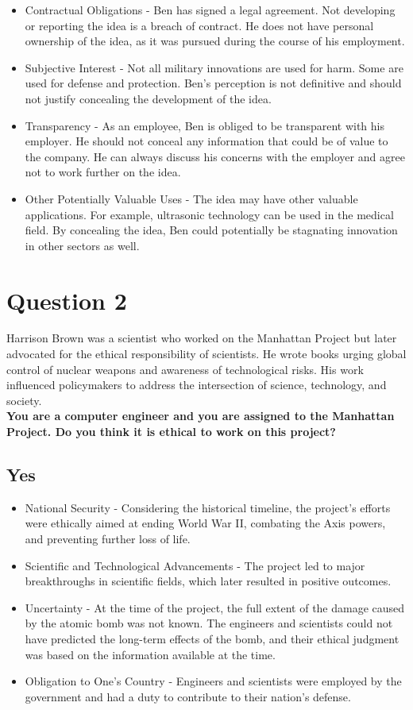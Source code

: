 \documentclass{article}
\begin{document}
\begin{itemize}
    \item Contractual Obligations - Ben has signed a legal agreement. Not developing or reporting the idea is a breach of contract. He does not have personal ownership of the idea, as it was pursued during the course of his employment.
    \item Subjective Interest - Not all military innovations are used for harm. Some are used for defense and protection. Ben’s perception is not definitive and should not justify concealing the development of the idea.
    \item Transparency - As an employee, Ben is obliged to be transparent with his employer. He should not conceal any information that could be of value to the company. He can always discuss his concerns with the employer and agree not to work further on the idea.
    \item Other Potentially Valuable Uses - The idea may have other valuable applications. For example, ultrasonic technology can be used in the medical field. By concealing the idea, Ben could potentially be stagnating innovation in other sectors as well.
\end{itemize}

\section{Question 2}
Harrison Brown was a scientist who worked on the Manhattan Project but later advocated for the ethical responsibility of scientists. He wrote books urging global control of nuclear weapons and awareness of technological risks. His work influenced policymakers to address the intersection of science, technology, and society.\\

\textbf{You are a computer engineer and you are assigned to the Manhattan Project. Do you think it is ethical to work on this project?}

\subsection{Yes}
\begin{itemize}
    \item National Security - Considering the historical timeline, the project’s efforts were ethically aimed at ending World War II, combating the Axis powers, and preventing further loss of life.
    \item Scientific and Technological Advancements - The project led to major breakthroughs in scientific fields, which later resulted in positive outcomes.
    \item Uncertainty - At the time of the project, the full extent of the damage caused by the atomic bomb was not known. The engineers and scientists could not have predicted the long-term effects of the bomb, and their ethical judgment was based on the information available at the time.
    \item Obligation to One’s Country - Engineers and scientists were employed by the government and had a duty to contribute to their nation’s defense.
\end{itemize}
\end{document}
